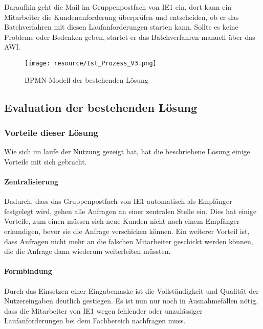 		Daraufhin geht die Mail im Gruppenpostfach von \ac{IE1} ein, dort kann ein Mitarbeiter die Kundenanforderung überprüfen und entscheiden, ob er das Batchverfahren mit diesen Laufanforderungen starten kann. Sollte es keine Probleme oder Bedenken geben, startet er das Batchverfahren manuell über das \ac{AWI}.
		
		\begin{figure}[H]
			\centering
			\texttt{[image: resource/Ist\_Prozess\_V3.png]}
			\caption{BPMN-Modell der bestehenden Lösung}
			\label{fig:Ist_Prozess}		
		\end{figure}
	
	\subsection{Evaluation der bestehenden Lösung}
		
		\subsubsection{Vorteile dieser Lösung}
		
			Wie sich im laufe der Nutzung gezeigt hat, hat die beschriebene Lösung einige Vorteile mit sich gebracht.
		
			\paragraph{Zentralisierung}
				
				Dadurch, dass das Gruppenpostfach von \ac{IE1} automatisch als Empfänger festgelegt wird, gehen alle Anfragen an einer zentralen Stelle ein. Dies hat einige Vorteile, zum einen müssen sich neue Kunden nicht nach einem Empfänger erkundigen, bevor sie die Anfrage verschicken können. Ein weiterer Vorteil ist, dass Anfragen nicht mehr an die falschen Mitarbeiter geschickt werden können, die die Anfrage dann wiederum weiterleiten müssten.  
			
			\paragraph{Formbindung}
			
				Durch das Einsetzen einer Eingabemaske ist die Vollständigkeit und Qualität der Nutzereingaben deutlich gestiegen. Es ist nun nur noch in Ausnahmefällen nötig, dass die Mitarbeiter von \ac{IE1} wegen fehlender oder unzulässiger Laufanforderungen bei dem Fachbereich nachfragen muss.  
		
